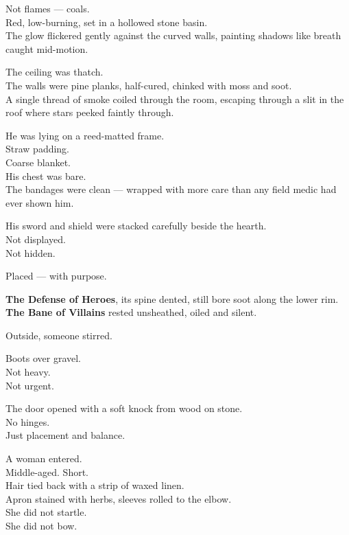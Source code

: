 \documentclass[9pt]{article}
\begin{document}
Not flames — coals.\\
Red, low-burning, set in a hollowed stone basin.\\
The glow flickered gently against the curved walls, painting shadows like breath caught mid-motion.

The ceiling was thatch.\\
The walls were pine planks, half-cured, chinked with moss and soot.\\
A single thread of smoke coiled through the room, escaping through a slit in the roof where stars peeked faintly through.

He was lying on a reed-matted frame.\\
Straw padding.\\
Coarse blanket.\\
His chest was bare.\\
The bandages were clean — wrapped with more care than any field medic had ever shown him.

\vspace{1em}

His sword and shield were stacked carefully beside the hearth.\\
Not displayed.\\
Not hidden.

Placed — with purpose.

\textbf{The Defense of Heroes}, its spine dented, still bore soot along the lower rim.\\
\textbf{The Bane of Villains} rested unsheathed, oiled and silent.

\vspace{1em}

Outside, someone stirred.

Boots over gravel.\\
Not heavy.\\
Not urgent.

The door opened with a soft knock from wood on stone.\\
No hinges.\\
Just placement and balance.

A woman entered.\\
Middle-aged. Short.\\
Hair tied back with a strip of waxed linen.\\
Apron stained with herbs, sleeves rolled to the elbow.\\
She did not startle.\\
She did not bow.
\end{document}
